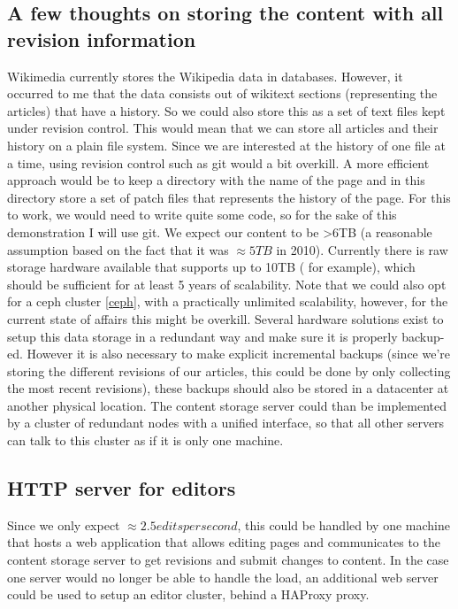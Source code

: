 \documentclass[12pt]{report}
\begin{document}
\subsection{A few thoughts on storing the content with all revision
  information}
Wikimedia currently stores the Wikipedia data in databases. However,
it occurred to me that the data consists out of wikitext sections
(representing the articles) that have a history. So we could also
store this as a set of text files kept under revision control.
This would mean that we can store all articles and their history on a
plain file system.
Since we are interested at the history of one file at a time, using 
revision control such as git would a bit overkill. A more efficient
approach would be to keep a directory with the name of the page and in
this directory store a set of patch files that represents the history of the
page.
For this to work, we would need to write quite some code, so for the
sake of this demonstration I will use git.
We expect our content to be >6TB (a reasonable assumption based on
the fact that it was $\approx 5TB$ in 2010). Currently there is raw
storage hardware available that supports up to 10TB
(\cite{hp_10TB_storage} for example), which should be
sufficient for at least 5 years of scalability.
Note that we could also opt for a ceph cluster \ref{ceph}, with a
practically unlimited scalability, however, for the current state of
affairs this might be overkill.
Several hardware solutions exist to setup this data storage in a
redundant way and make sure it is properly backup-ed. However it is
also necessary to make explicit incremental backups (since
we're storing the different revisions of our articles, this could be
done by only collecting the most recent revisions), these backups
should also be stored in a datacenter at another physical location.
The content storage server could than be implemented by a cluster of
redundant nodes with a unified interface, so that all other servers
can talk to this cluster as if it is only one machine.

\subsection{HTTP server for editors}
Since we only expect $\approx 2.5 edits per second$, this could be
handled by one machine that hosts a web application that allows
editing pages and communicates to the content storage server to get
revisions and submit changes to content.
In the case one server would no longer be able to handle the load, an
additional web server could be used to setup an editor cluster, behind
a HAProxy proxy.
\end{document}
